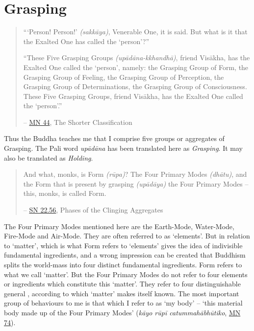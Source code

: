 \chapter{Grasping}

\begin{quote}
``\thinspace `Person! Person!' \emph{(sakkāya)}, Venerable One, it is said. But what is it that the Exalted One has called the `person'?''

``These Five Grasping Groups \emph{(upādāna-kkhandhā)}, friend Visākha, has the Exalted One called the `person', namely: the Grasping Group of Form, the Grasping Group of Feeling, the Grasping Group of Perception, the Grasping Group of Determinations, the Grasping Group of Consciousness. These Five Grasping Groups, friend Visākha, has the Exalted One called the `person'.''

 -- \href{https://suttacentral.net/mn44/en/sujato}{MN 44}, The Shorter Classification
\end{quote}

Thus the Buddha teaches me that I comprise five groups or aggregates of Grasping. The Pali word \emph{upādāna} has been translated here as \emph{Grasping}. It may also be translated as \emph{Holding}.

\begin{quote}
And what, monks, is Form \emph{(rūpa)}? The Four Primary Modes \emph{(dhātu)}, and the Form that is present by grasping \emph{(upādāya)} the Four Primary Modes -- this, monks, is called Form.

 -- \href{https://suttacentral.net/sn22.56/en/bodhi}{SN 22.56}, Phases of the Clinging Aggregates
\end{quote}

The Four Primary Modes mentioned here are the Earth-Mode, Water-Mode, Fire-Mode and Air-Mode. They are often referred to as `elements'. But in relation to `matter', which is what Form refers to `elements' gives the idea of indivisible fundamental ingredients, and a wrong impression can be created that Buddhism splits the world-mass into four distinct fundamental ingredients. Form refers to what we call `matter'. But the Four Primary Modes do not refer to four elements or ingredients which constitute this `matter'. They refer to four distinguishable general , according to which `matter' makes itself known. The most important group of behaviours to me is that which I refer to as `my body' -- `this material body made up of the Four Primary Modes' (\emph{kāyo rūpī catummahābhūtiko}, \href{https://suttacentral.net/mn74/en/sujato}{MN 74}).

